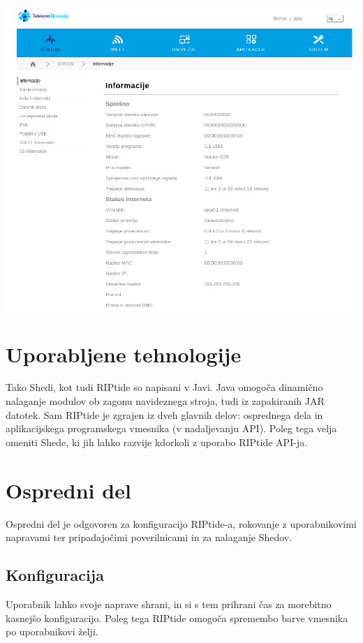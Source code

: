 \documentclass[12pt]{article}
\begin{document}
\begin{center}
	\includegraphics[scale=0.5]{slike/telekom.png}
\end{center}
\newpage

\section{Uporabljene tehnologije}
Tako Shedi, kot tudi RIPtide so napisani v Javi. Java omogoča dinamično
nalaganje modulov ob zagonu navideznega stroja, tudi iz zapakiranih JAR
datotek. Sam RIPtide je zgrajen iz dveh glavnih delov: osprednega dela 
in aplikacijskega programskega vmesnika (v nadaljevanju API).
Poleg tega velja omeniti Shede, ki jih lahko razvije kdorkoli z uporabo
RIPtide API-ja.
\newpage

\section{Ospredni del}
Ospredni del je odgovoren za konfiguracijo RIPtide-a, rokovanje z 
uporabnikovimi napravami ter pripadajočimi poverilnicami in za
nalaganje Shedov.

\subsection{Konfiguracija}
Uporabnik lahko svoje naprave shrani, in si s tem prihrani čas za morebitno
kasnejšo konfiguracijo. Poleg tega RIPtide omogoča spremembo barve vmesnika
po uporabnikovi želji.
\end{document}
